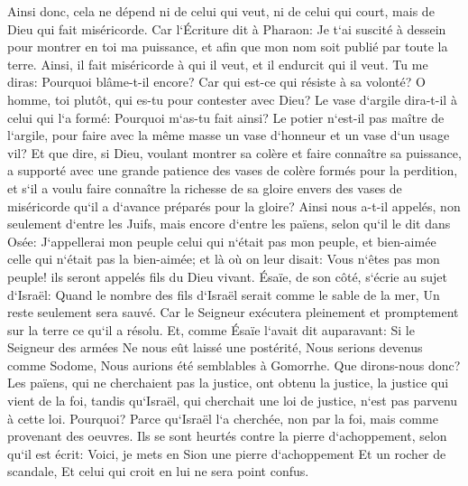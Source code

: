\verse Ainsi donc, cela ne dépend ni de celui qui veut, ni de celui qui court, mais de Dieu qui fait miséricorde. 
\verse Car l`Écriture dit à Pharaon: Je t`ai suscité à dessein pour montrer en toi ma puissance, et afin que mon nom soit publié par toute la terre. 
\verse Ainsi, il fait miséricorde à qui il veut, et il endurcit qui il veut. 
\verse Tu me diras: Pourquoi blâme-t-il encore? Car qui est-ce qui résiste à sa volonté? 
\verse O homme, toi plutôt, qui es-tu pour contester avec Dieu? Le vase d`argile dira-t-il à celui qui l`a formé: Pourquoi m`as-tu fait ainsi? 
\verse Le potier n`est-il pas maître de l`argile, pour faire avec la même masse un vase d`honneur et un vase d`un usage vil? 
\verse Et que dire, si Dieu, voulant montrer sa colère et faire connaître sa puissance, a supporté avec une grande patience des vases de colère formés pour la perdition, 
\verse et s`il a voulu faire connaître la richesse de sa gloire envers des vases de miséricorde qu`il a d`avance préparés pour la gloire? 
\verse Ainsi nous a-t-il appelés, non seulement d`entre les Juifs, mais encore d`entre les païens, 
\verse selon qu`il le dit dans Osée: J`appellerai mon peuple celui qui n`était pas mon peuple, et bien-aimée celle qui n`était pas la bien-aimée; 
\verse et là où on leur disait: Vous n`êtes pas mon peuple! ils seront appelés fils du Dieu vivant. 
\verse Ésaïe, de son côté, s`écrie au sujet d`Israël: Quand le nombre des fils d`Israël serait comme le sable de la mer, Un reste seulement sera sauvé. 
\verse Car le Seigneur exécutera pleinement et promptement sur la terre ce qu`il a résolu. 
\verse Et, comme Ésaïe l`avait dit auparavant: Si le Seigneur des armées Ne nous eût laissé une postérité, Nous serions devenus comme Sodome, Nous aurions été semblables à Gomorrhe. 
\verse Que dirons-nous donc? Les païens, qui ne cherchaient pas la justice, ont obtenu la justice, la justice qui vient de la foi, 
\verse tandis qu`Israël, qui cherchait une loi de justice, n`est pas parvenu à cette loi. 
\verse Pourquoi? Parce qu`Israël l`a cherchée, non par la foi, mais comme provenant des oeuvres. Ils se sont heurtés contre la pierre d`achoppement, 
\verse selon qu`il est écrit: Voici, je mets en Sion une pierre d`achoppement Et un rocher de scandale, Et celui qui croit en lui ne sera point confus. 

